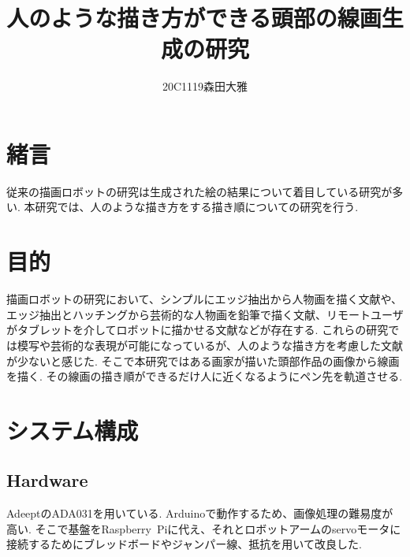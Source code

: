 \documentclass[10pt]{jarticle}
\begin{document}
    
    \makeatletter
    \title{人のような描き方ができる頭部の線画生成の研究}{}
    
    \author{20C1119\hspace{.5zw}森田大雅}
    
    \makeatother
    
    
    
    \maketitle
    
    
    \section{緒\hspace{2zw}言}%
	従来の描画ロボットの研究は生成された絵の結果について着目している研究が多い.
	本研究では、人のような描き方をする描き順についての研究を行う.


    \section{目的}
    
	描画ロボットの研究において、シンプルにエッジ抽出から人物画を描く文献\cite{1}や、エッジ抽出とハッチングから芸術的な人物画を鉛筆で描く文献\cite{2}、リモートユーザがタブレットを介してロボットに描かせる文献\cite{3}などが存在する.
	これらの研究では模写や芸術的な表現が可能になっているが、人のような描き方を考慮した文献が少ないと感じた.
	そこで本研究ではある画家が描いた頭部作品の画像から線画を描く. その線画の描き順ができるだけ人に近くなるようにペン先を軌道させる.
    
    \section{システム構成}
	
	\subsection{Hardware}
	AdeeptのADA031を用いている.
	Arduinoで動作するため、画像処理の難易度が高い.
	そこで基盤をRaspberry\ Piに代え、それとロボットアームのservoモータに接続するためにブレッドボードやジャンパー線、抵抗を用いて改良した.
	
\end{document}
